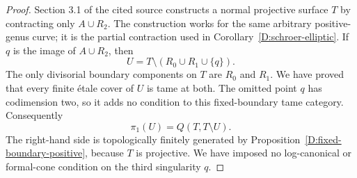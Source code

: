 \begin{proof}
Section 3.1 of the cited source constructs a normal projective
surface $T$ by contracting only $A\cup R_2$.  The construction
works for the same arbitrary positive-genus curve; it is the
partial contraction used in Corollary~\ref{D:schroer-elliptic}.
If $q$ is the image of $A\cup R_2$, then
\[
                   U=T\setminus(R_0\cup R_1\cup\{q\}).
\]
The only divisorial boundary components on $T$ are $R_0$ and
$R_1$.  We have proved that every finite \'etale cover of $U$
is tame at both.  The omitted point $q$ has codimension two,
so it adds no condition to this fixed-boundary tame category.
Consequently
\[
                   \pi_1(U)=Q(T,T\setminus U).
\]
The right-hand side is topologically finitely generated by
Proposition~\ref{D:fixed-boundary-positive}, because $T$ is
projective.  We have imposed no log-canonical or formal-cone
condition on the third singularity $q$.
\end{proof}
